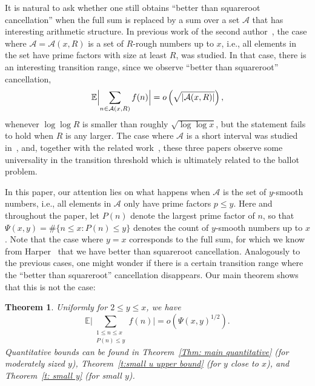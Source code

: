 \documentclass[12pt,a4paper,reqno]{amsart}
\numberwithin{equation}{section}
\def\E{\mathbb E}
\def\CA{\mathcal{A}}
\def\leq {\leqslant}
\newtheorem{theorem}{Theorem}[section]
\theoremstyle{remark}
\theoremstyle{definition}
\numberwithin{equation}{section}
\theoremstyle{remark}
\def\E{\mathbb E}
\begin{document}
It is natural to ask whether one still obtains ``better than squareroot cancellation'' when the full sum is replaced by a sum over a set $\CA$ that has interesting arithmetic structure. In previous work of the second author~\cite{Xu}, the case where $\CA = \CA (x, R)$ is a set of $R$-rough numbers up to $x$, i.e., all elements in the set have prime factors with size at least $R$, was studied. In that case, there is an interesting transition range, since we observe ``better than squareroot'' cancellation,
\[
\E \Bigl| \sum_{n \in \CA (x, R)} f(n) \Bigr| = o \left(\sqrt{|\CA (x, R)|} \right) ,
\]
whenever $\log \log R$ is smaller than roughly $\sqrt{\log \log x}$, but the statement fails to hold when $R$ is any larger. The case where $\mathcal{A}$ is a short interval was studied in~\cite{Caichshort}, and, together with the related work~\cite{Chang}, these three papers observe some universality in the transition threshold which is ultimately related to the ballot problem.

In this paper, our attention lies on what happens when $\CA$ is the set of $y$-smooth numbers, i.e., all elements in $\CA$ only have prime factors $p\leq y$. Here and throughout the paper, let $P(n)$ denote the largest prime factor of $n$, so that $\Psi(x,y) = \# \{ n \leq x : P(n) \leq y \}$ denotes the count of $y$-smooth numbers up to $x$. Note that the case where $y=x$ corresponds to the full sum, for which we know from Harper~\cite{HarperLow} that we have better than squareroot cancellation. Analogously to the previous cases, one might wonder if there is a certain transition range where the ``better than squareroot'' cancellation disappears. 
Our main theorem shows that this is not the case:

\begin{theorem}\label{Thm: main}
Uniformly for $2 \leq y \leq x$, we have
\[
\E \Big|\sum_{\substack{1\leq n \leq x\\ P(n) \leq y}} f(n) \Big| = o\left( \Psi(x,y)^{1/2} \right) .
\]
Quantitative bounds can be found in Theorem~\ref{Thm: main quantitative} (for moderately sized $y$), Theorem~\ref{t:small u upper bound} (for $y$ close to $x$), and Theorem~\ref{t: small y} (for small $y$).
\end{theorem}
\end{document}

